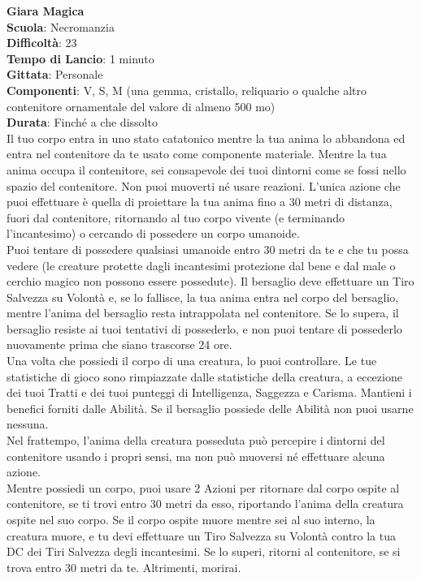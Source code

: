 \begin{multicols}{2}
\medskip\textbf{Giara Magica}\\
\textbf{Scuola}: Necromanzia\\
\textbf{Difficoltà}:  23\\
\textbf{Tempo di Lancio}: 1 minuto\\
\textbf{Gittata}: Personale\\
\textbf{Componenti}: V, S, M (una gemma, cristallo, reliquario o qualche altro contenitore ornamentale del valore di almeno 500 mo)\\
\textbf{Durata}: Finché a che dissolto\\
Il tuo corpo entra in uno stato catatonico mentre la tua anima lo abbandona ed entra nel contenitore da te usato come componente materiale. Mentre la tua anima occupa il contenitore, sei consapevole dei tuoi dintorni come se fossi nello spazio del contenitore. Non puoi muoverti né usare reazioni. L’unica azione che puoi effettuare è quella di proiettare la tua anima fino a 30 metri di distanza, fuori dal contenitore, ritornando al tuo corpo vivente (e terminando l'incantesimo) o cercando di possedere un corpo umanoide.\\
Puoi tentare di possedere qualsiasi umanoide entro 30 metri da te e che tu possa vedere (le creature protette dagli incantesimi protezione dal bene e dal male o cerchio magico non possono essere possedute). Il bersaglio deve effettuare un Tiro Salvezza su Volontà e, se lo fallisce, la tua anima entra nel corpo del bersaglio, mentre l’anima del bersaglio resta intrappolata nel contenitore. Se lo supera, il bersaglio resiste ai tuoi tentativi di possederlo, e non puoi tentare di possederlo nuovamente prima che siano trascorse 24 ore.\\
Una volta che possiedi il corpo di una creatura, lo puoi controllare. Le tue statistiche di gioco sono rimpiazzate dalle statistiche della creatura, a eccezione dei tuoi Tratti e dei tuoi punteggi di Intelligenza, Saggezza e Carisma. Mantieni i benefici forniti dalle Abilità. Se il bersaglio possiede delle Abilità non puoi usarne nessuna.\\
Nel frattempo, l’anima della creatura posseduta può percepire i dintorni del contenitore usando i propri sensi, ma non può muoversi né effettuare alcuna azione.\\
Mentre possiedi un corpo, puoi usare 2 Azioni per ritornare dal corpo ospite al contenitore, se ti trovi entro 30 metri da esso, riportando l’anima della creatura ospite nel suo corpo. Se il corpo ospite muore mentre sei al suo interno, la creatura muore, e tu devi effettuare un Tiro Salvezza su Volontà contro la tua DC dei Tiri Salvezza degli incantesimi. Se lo superi, ritorni al contenitore, se si trova entro 30 metri da te. Altrimenti, morirai.\\

\end{multicols}
